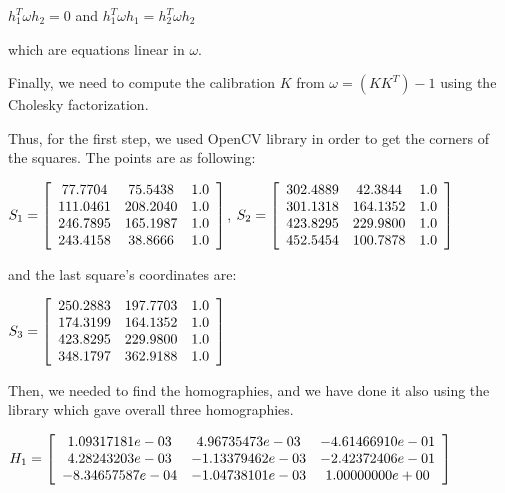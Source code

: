 \documentclass[]{article}
\begin{document}
\centerline {
	$h_1^T \omega h_2 = 0$ and $h_1^T \omega h_1 = h_2^T \omega h_2$
}


which are equations linear in $\omega$. 

Finally, we need to compute the calibration $K$ from $\omega = (KK^T)-1$ using the Cholesky factorization. 

\vspace{0.4em}

Thus, for the first step, we used OpenCV library in order to get the corners of the squares. The points are as following:

\centerline {
		$S_1 =\left[ {\begin{array}{*{20}c}
		77.7704 & 75.5438 & 1.0 \\
		111.0461 & 208.2040 & 1.0  \\ 
		246.7895 & 165.1987 & 1.0 \\
		243.4158 & 38.8666 & 1.0  
		\end{array} } \right] $, $S_2 =\left[ {\begin{array}{*{20}c}
		302.4889 & 42.3844 & 1.0 \\
		301.1318 & 164.1352 & 1.0  \\ 
		423.8295 & 229.9800 & 1.0 \\
		452.5454 & 100.7878 & 1.0  
		\end{array} } \right] $
}

and the last square's coordinates are: 

\centerline {
	$S_3 =\left[ {\begin{array}{*{20}c}
		250.2883 & 197.7703 & 1.0 \\
		174.3199 & 164.1352 & 1.0  \\ 
		423.8295 & 229.9800 & 1.0 \\
		348.1797 & 362.9188 & 1.0  
		\end{array} } \right] $
}

Then, we needed to find the homographies, and we have done it also using the library which gave overall three homographies. 

\vspace{0.5em}

\centerline {
	$H_1 =\left[ {\begin{array}{*{20}c}
		1.09317181e-03 & 4.96735473e-03 & -4.61466910e-01 \\
		4.28243203e-03 & -1.13379462e-03 & -2.42372406e-01  \\ 
		-8.34657587e-04 & -1.04738101e-03 & 1.00000000e+00 
		\end{array} } \right] $
}
\end{document}
